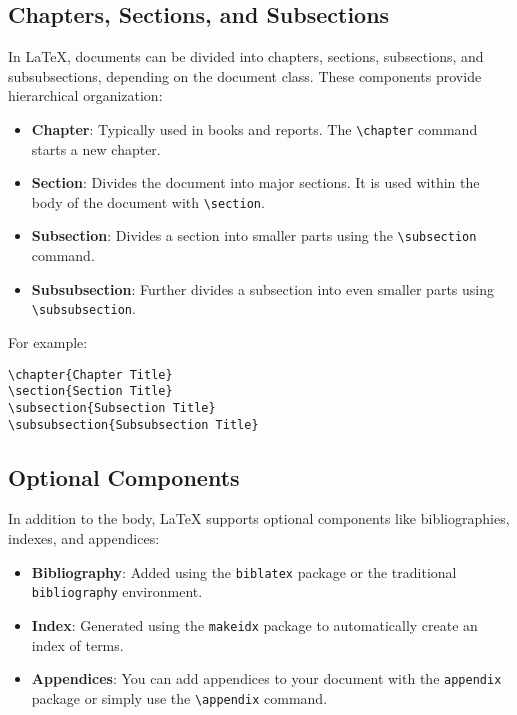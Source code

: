 \subsection{Chapters, Sections, and Subsections}
In LaTeX, documents can be divided into chapters, sections, subsections, and subsubsections, depending on the document class. These components provide hierarchical organization:
\begin{itemize}
    \item \textbf{Chapter}: Typically used in books and reports. The \texttt{\textbackslash chapter} command starts a new chapter.
    \item \textbf{Section}: Divides the document into major sections. It is used within the body of the document with \texttt{\textbackslash section}.
    \item \textbf{Subsection}: Divides a section into smaller parts using the \texttt{\textbackslash subsection} command.
    \item \textbf{Subsubsection}: Further divides a subsection into even smaller parts using \texttt{\textbackslash subsubsection}.
\end{itemize}

For example:
\begin{verbatim}
\chapter{Chapter Title}
\section{Section Title}
\subsection{Subsection Title}
\subsubsection{Subsubsection Title}
\end{verbatim}

\subsection{Optional Components}
In addition to the body, LaTeX supports optional components like bibliographies, indexes, and appendices:
\begin{itemize}
    \item \textbf{Bibliography}: Added using the \texttt{biblatex} package or the traditional \texttt{bibliography} environment.
    \item \textbf{Index}: Generated using the \texttt{makeidx} package to automatically create an index of terms.
    \item \textbf{Appendices}: You can add appendices to your document with the \texttt{appendix} package or simply use the \texttt{\textbackslash appendix} command.
\end{itemize}

